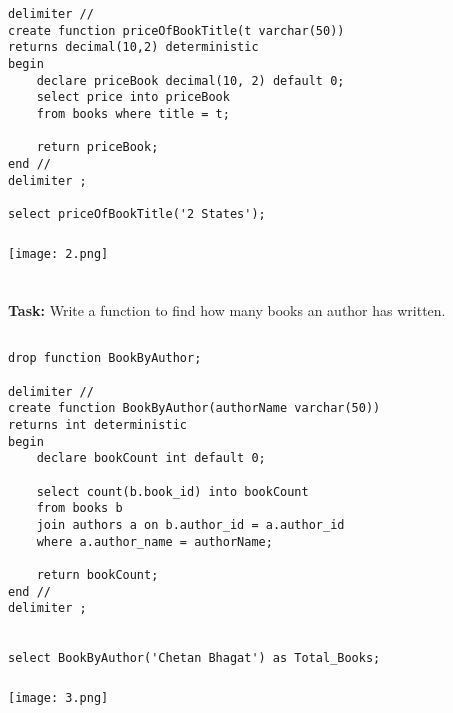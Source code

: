 \documentclass[12pt,a4paper]{article}
\begin{document}
\subsection{}
\begin{lstlisting}

delimiter //
create function priceOfBookTitle(t varchar(50))
returns decimal(10,2) deterministic
begin
	declare priceBook decimal(10, 2) default 0;
    select price into priceBook
    from books where title = t;
    
    return priceBook;
end //
delimiter ;

select priceOfBookTitle('2 States');
\end{lstlisting}

\subsubsection{}
\begin{center}
    \texttt{[image: 2.png]}
\end{center}


\section{}
\textbf{Task:} Write a function to find how many books an author has written.

\subsection{}
\begin{lstlisting}
drop function BookByAuthor;

delimiter //
create function BookByAuthor(authorName varchar(50))
returns int deterministic
begin
	declare bookCount int default 0;
    
    select count(b.book_id) into bookCount
    from books b
    join authors a on b.author_id = a.author_id
    where a.author_name = authorName;
    
    return bookCount;
end //
delimiter ;


select BookByAuthor('Chetan Bhagat') as Total_Books;
\end{lstlisting}

\subsubsection{}
\begin{center}
    \texttt{[image: 3.png]}
\end{center}
\end{document}
